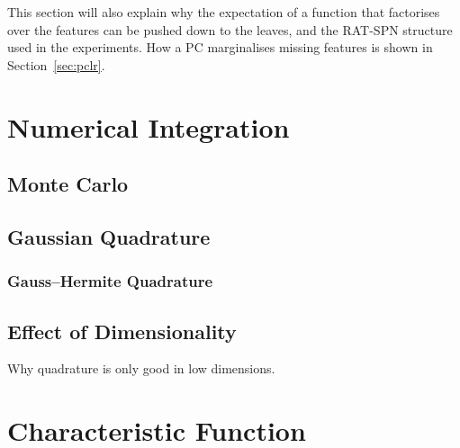 This section will also explain why the expectation of a function that factorises over the features can be pushed down to the leaves, and the RAT-SPN structure used in the experiments. How a PC marginalises missing features is shown in Section~\ref{sec:pclr}.

\section{Numerical Integration}
\label{sec:numerical-integration}

\subsection{Monte Carlo}
\label{subsec:monte-carlo}

\subsection{Gaussian Quadrature}
\label{subsec:gaussian-quadrature}

\subsubsection{Gauss--Hermite Quadrature}
\label{subsec:bg-gauss-hermite}

\subsection{Effect of Dimensionality}
\label{subsec:effect-of-dimensionality}

Why quadrature is only good in low dimensions.

\section{Characteristic Function}
\label{sec:characteristic-function}

